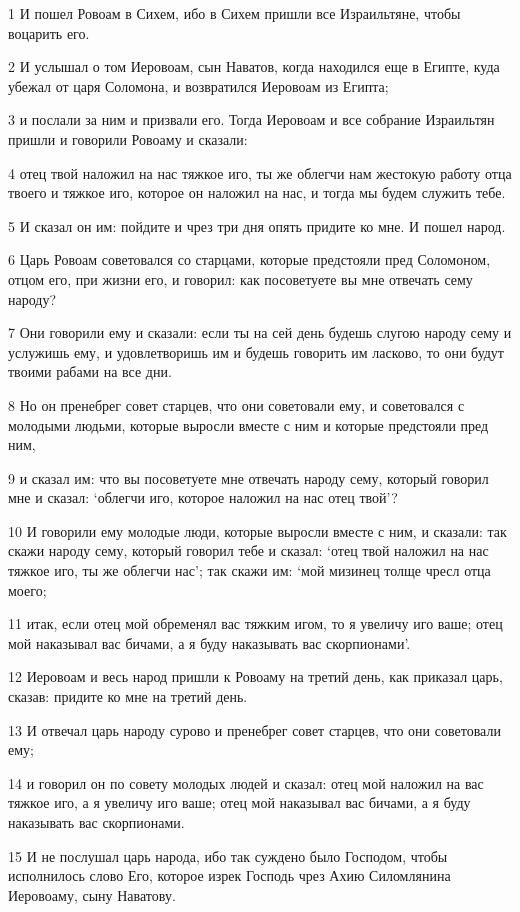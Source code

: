 \par 1 И пошел Ровоам в Сихем, ибо в Сихем пришли все Израильтяне, чтобы воцарить его.
\par 2 И услышал о том Иеровоам, сын Наватов, когда находился еще в Египте, куда убежал от царя Соломона, и возвратился Иеровоам из Египта;
\par 3 и послали за ним и призвали его. Тогда Иеровоам и все собрание Израильтян пришли и говорили Ровоаму и сказали:
\par 4 отец твой наложил на нас тяжкое иго, ты же облегчи нам жестокую работу отца твоего и тяжкое иго, которое он наложил на нас, и тогда мы будем служить тебе.
\par 5 И сказал он им: пойдите и чрез три дня опять придите ко мне. И пошел народ.
\par 6 Царь Ровоам советовался со старцами, которые предстояли пред Соломоном, отцом его, при жизни его, и говорил: как посоветуете вы мне отвечать сему народу?
\par 7 Они говорили ему и сказали: если ты на сей день будешь слугою народу сему и услужишь ему, и удовлетворишь им и будешь говорить им ласково, то они будут твоими рабами на все дни.
\par 8 Но он пренебрег совет старцев, что они советовали ему, и советовался с молодыми людьми, которые выросли вместе с ним и которые предстояли пред ним,
\par 9 и сказал им: что вы посоветуете мне отвечать народу сему, который говорил мне и сказал: `облегчи иго, которое наложил на нас отец твой'?
\par 10 И говорили ему молодые люди, которые выросли вместе с ним, и сказали: так скажи народу сему, который говорил тебе и сказал: `отец твой наложил на нас тяжкое иго, ты же облегчи нас'; так скажи им: `мой мизинец толще чресл отца моего;
\par 11 итак, если отец мой обременял вас тяжким игом, то я увеличу иго ваше; отец мой наказывал вас бичами, а я буду наказывать вас скорпионами'.
\par 12 Иеровоам и весь народ пришли к Ровоаму на третий день, как приказал царь, сказав: придите ко мне на третий день.
\par 13 И отвечал царь народу сурово и пренебрег совет старцев, что они советовали ему;
\par 14 и говорил он по совету молодых людей и сказал: отец мой наложил на вас тяжкое иго, а я увеличу иго ваше; отец мой наказывал вас бичами, а я буду наказывать вас скорпионами.
\par 15 И не послушал царь народа, ибо так суждено было Господом, чтобы исполнилось слово Его, которое изрек Господь чрез Ахию Силомлянина Иеровоаму, сыну Наватову.
